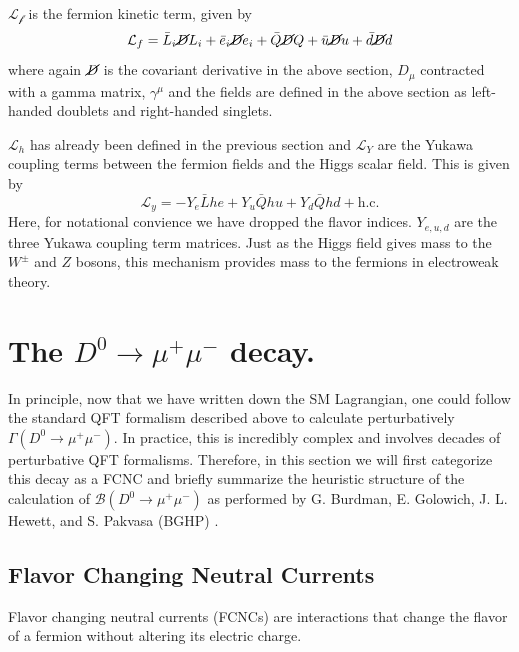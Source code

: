 $\mathcal{L_f}$ is the fermion kinetic term, given by
\begin{equation}
\mathcal{L}_{f} = \bar{L}_{i}\cancel{D}L_{i} + \bar{e}_{i}\cancel{D}e_{i} + \bar{Q}\cancel{D}Q + \bar{u} \cancel{D}u + \bar{d}\cancel{D}d
\label{eq:fermion_kinetic_term}
\end{equation}
where again $\cancel{D}$ is the covariant derivative in the above section, $D_\mu$ contracted with a gamma matrix, $\gamma^\mu$ and the fields are defined in the above section as left-handed doublets and right-handed singlets.

$\mathcal{L}_h$ has already been defined in the previous section and $\mathcal{L}_Y$ are the Yukawa coupling terms between the fermion fields and the Higgs scalar field. This is given by
\begin{equation}
\mathcal{L}_{y} = - Y_{e} \bar{L}he + Y_{u}\bar{Q}h u + Y_{d} \bar{Q}h d
 + \text{h.c.}
\end{equation}
Here, for notational convience we have dropped the flavor indices. $Y_{e,u,d}$ are the three Yukawa coupling term matrices. Just as the Higgs field gives mass to the $W^\pm$ and $Z$ bosons, this mechanism provides mass to the fermions in electroweak theory. 

\section{The $D^0 \to \mu^+ \mu^-$ decay.}

In principle, now that we have written down the SM Lagrangian, one could follow the standard QFT formalism described above to calculate perturbatively $\Gamma(D^0 \to \mu^+ \mu^-)$. In practice, this is incredibly complex and involves decades of perturbative QFT formalisms. Therefore, in this section we will first categorize this decay as a FCNC and briefly summarize the heuristic structure of the calculation of $\mathcal{B}(D^0 \to \mu^+ \mu^-)$ as performed by G. Burdman, E. Golowich, J. L. Hewett, and S. Pakvasa (BGHP) \cite{ref:burdman_2002}.

\subsection{Flavor Changing Neutral Currents}

Flavor changing neutral currents (FCNCs) are interactions that change the flavor of a fermion without altering its electric charge. 

